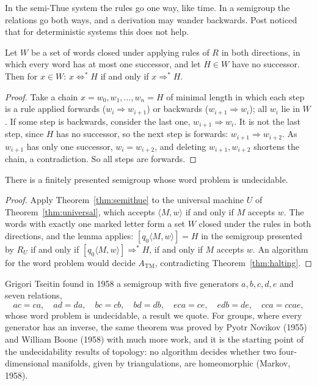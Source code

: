In the semi-Thue system the rules go one way, like time. In a semigroup the relations go both ways, and a derivation may wander backwards. Post noticed that for deterministic systems this does not help.

\begin{lemma}[Post, 1947]\label{lem:post}
Let $W$ be a set of words closed under applying rules of $R$ in both directions, in which every word has at most one successor, and let $H\in W$ have no successor. Then for $x\in W$: $x\Leftrightarrow^*H$ if and only if $x\Rightarrow^*H$.
\end{lemma}

\begin{proof}
Take a chain $x=w_0,w_1,\dots,w_n=H$ of minimal length in which each step is a rule applied forwards ($w_i\Rightarrow w_{i+1}$) or backwards ($w_{i+1}\Rightarrow w_i$); all $w_i$ lie in $W$. If some step is backwards, consider the last one, $w_{i+1}\Rightarrow w_i$. It is not the last step, since $H$ has no successor, so the next step is forwards: $w_{i+1}\Rightarrow w_{i+2}$. As $w_{i+1}$ has only one successor, $w_i=w_{i+2}$, and deleting $w_{i+1},w_{i+2}$ shortens the chain, a contradiction. So all steps are forwards.
\end{proof}

\begin{corollary}\label{cor:semigroup}
There is a finitely presented semigroup whose word problem is undecidable.
\end{corollary}

\begin{proof}
Apply Theorem~\ref{thm:semithue} to the universal machine $U$ of Theorem~\ref{thm:universal}, which accepts $\langle M,w\rangle$ if and only if $M$ accepts $w$. The words with exactly one marked letter form a set $W$ closed under the rules in both directions, and the lemma applies: $[q_0\langle M,w\rangle]=H$ in the semigroup presented by $R_U$ if and only if $[q_0\langle M,w\rangle]\Rightarrow^*H$, if and only if $M$ accepts $w$. An algorithm for the word problem would decide $A_{\mathrm{TM}}$, contradicting Theorem~\ref{thm:halting}.
\end{proof}

Grigori Tseitin found in 1958 a semigroup with five generators $a,b,c,d,e$ and seven relations,
\[
ac=ca,\quad ad=da,\quad bc=cb,\quad bd=db,\quad eca=ce,\quad edb=de,\quad cca=ccae,
\]
whose word problem is undecidable, a result we quote. For groups, where every generator has an inverse, the same theorem was proved by Pyotr Novikov (1955) and William Boone (1958) with much more work, and it is the starting point of the undecidability results of topology: no algorithm decides whether two four-dimensional manifolds, given by triangulations, are homeomorphic (Markov, 1958).

